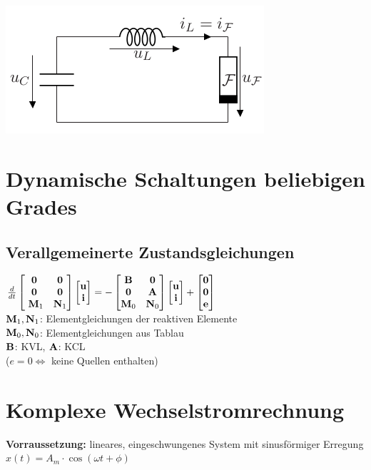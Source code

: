 \documentclass[fs, footer]{latex4ei}
\begin{document}
\begin{multicols*}{4}
    \includegraphics[width=.5\linewidth]{img/relaxationsoszillator-schaltung}
    \section{Dynamische Schaltungen beliebigen Grades}
    \subsection{Verallgemeinerte Zustandsgleichungen}
    $\frac{d}{dt} \begin{bmatrix} \textbf{0} & \textbf{0}\\\textbf{0} & \textbf{0}\\\ \textbf{M}_1 & \textbf{N}_1 \end{bmatrix}\begin{bmatrix} \textbf{u}\\\textbf{i} \end{bmatrix} = - \begin{bmatrix}  \textbf{B} & \textbf{0} \\ \textbf{0} & \textbf{A} \\ \textbf{M}_0 & \textbf{N}_0 \end{bmatrix}\begin{bmatrix} \textbf{u}\\\textbf{i} \end{bmatrix} + \begin{bmatrix} \textbf{0}\\\textbf{0}\\\textbf{e} \end{bmatrix}$\\
    $\textbf{M}_1, \textbf{N}_1$: Elementgleichungen der reaktiven Elemente\\
    $\textbf{M}_0, \textbf{N}_0$: Elementgleichungen aus Tablau\\
    $\textbf{B}$: KVL, $\textbf{A}$: KCL\\
    ($e = 0 \Leftrightarrow$ keine Quellen enthalten)
    \section{Komplexe Wechselstromrechnung}
    \textbf{Vorraussetzung:} lineares, eingeschwungenes System mit sinusförmiger Erregung $x(t) = A_m \cdot \cos(\omega t + \phi)$\\
    \sectionbox{
}
\end{multicols*}
\end{document}
